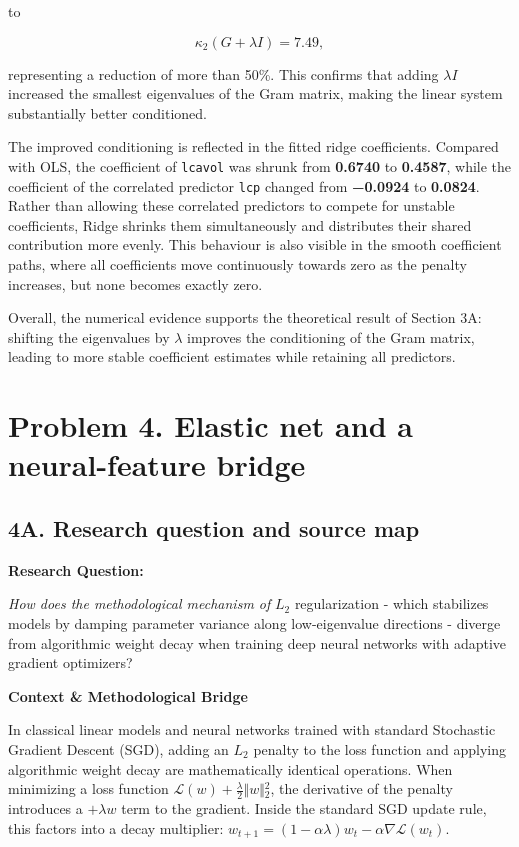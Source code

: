 \documentclass[
  11pt,
]{article}
\newcounter{none} %
\begin{document}
to

\[\kappa_2(G+\lambda I)=7.49,\]

representing a reduction of more than 50\%. This confirms that adding
\(\lambda I\) increased the smallest eigenvalues of the Gram matrix,
making the linear system substantially better conditioned.

The improved conditioning is reflected in the fitted ridge coefficients.
Compared with OLS, the coefficient of \texttt{lcavol} was shrunk from
\textbf{0.6740} to \textbf{0.4587}, while the coefficient of the
correlated predictor \texttt{lcp} changed from \textbf{−0.0924} to
\textbf{0.0824}. Rather than allowing these correlated predictors to
compete for unstable coefficients, Ridge shrinks them simultaneously and
distributes their shared contribution more evenly. This behaviour is
also visible in the smooth coefficient paths, where all coefficients
move continuously towards zero as the penalty increases, but none
becomes exactly zero.

Overall, the numerical evidence supports the theoretical result of
Section 3A: shifting the eigenvalues by \(\lambda\) improves the
conditioning of the Gram matrix, leading to more stable coefficient
estimates while retaining all predictors.

\section{Problem 4. Elastic net and a neural-feature
bridge}\label{problem-4.-elastic-net-and-a-neural-feature-bridge}

\subsection{4A. Research question and source
map}\label{a.-research-question-and-source-map}

\textbf{Research Question:}

\emph{How does the methodological mechanism of} \(L_2\) regularization -
which stabilizes models by damping parameter variance along
low-eigenvalue directions - diverge from algorithmic weight decay when
training deep neural networks with adaptive gradient optimizers?

\textbf{Context \& Methodological Bridge}

In classical linear models and neural networks trained with standard
Stochastic Gradient Descent (SGD), adding an \(L_2\) penalty to the loss
function and applying algorithmic weight decay are mathematically
identical operations. When minimizing a loss function
\(\mathcal{L}(w) + \frac{\lambda}{2} \Vert{}w\Vert{}_2^2\), the
derivative of the penalty introduces a \(+\lambda w\) term to the
gradient. Inside the standard SGD update rule, this factors into a decay
multiplier:
\(w_{t+1} = (1 - \alpha\lambda)w_t - \alpha \nabla \mathcal{L}(w_t)\).
\end{document}

